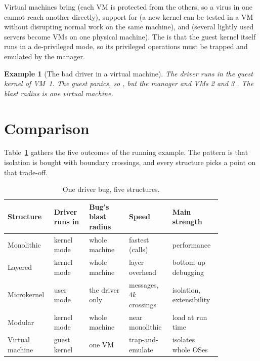 \documentclass[11pt]{article}
\newtheorem{example}{Example}
\begin{document}
Virtual machines bring  (each VM is protected from the others,
so a virus in one cannot reach another directly), support for  (a new kernel can be tested in a VM without disrupting normal work
on the same machine), and  (several lightly used servers
become VMs on one physical machine). The  is that the guest kernel
itself runs in a de-privileged mode, so its privileged operations must be
trapped and emulated by the manager.

\begin{example}[The bad driver in a virtual machine]
The driver runs in the \emph{guest} kernel of VM~1. The guest panics, so
, but the manager and VMs 2 and 3 .
The blast radius is one virtual machine.
\end{example}

\section{Comparison}

Table~\ref{tab:compare} gathers the five outcomes of the running example. The
pattern is that isolation is bought with boundary crossings, and every
structure picks a point on that trade-off.

\begin{table}[h]
\centering
\small
\renewcommand{\arraystretch}{1.3}
\begin{tabular}{@{}>{\raggedright\arraybackslash}p{0.14\linewidth}>{\raggedright\arraybackslash}p{0.15\linewidth}>{\raggedright\arraybackslash}p{0.17\linewidth}>{\raggedright\arraybackslash}p{0.18\linewidth}>{\raggedright\arraybackslash}p{0.20\linewidth}@{}}
\toprule
\textbf{Structure} & \textbf{Driver runs in} & \textbf{Bug's blast radius} & \textbf{Speed} & \textbf{Main strength} \\
\midrule
Monolithic & kernel mode & whole machine & fastest (calls) & performance \\
Layered & kernel mode & whole machine & layer overhead & bottom-up debugging \\
Microkernel & user mode & the driver only & messages, $4k$ crossings & isolation, extensibility \\
Modular & kernel mode & whole machine & near monolithic & load at run time \\
Virtual machine & guest kernel & one VM & trap-and-emulate & isolates whole OSes \\
\bottomrule
\end{tabular}
\caption{One driver bug, five structures.}
\label{tab:compare}
\end{table}
\end{document}
